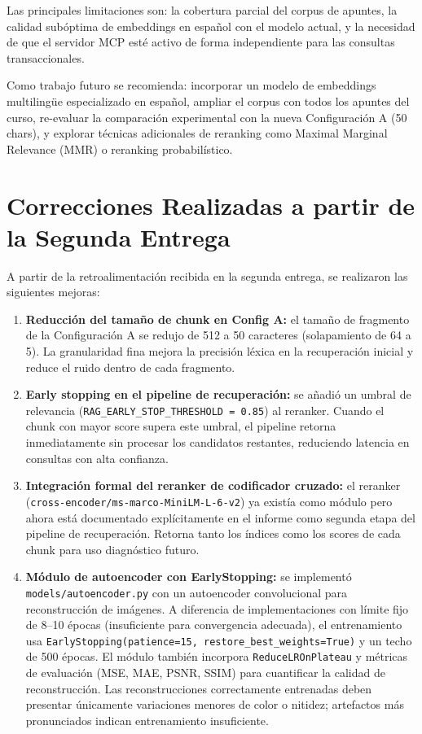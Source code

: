\documentclass[conference]{IEEEtran}
\begin{document}
Las principales limitaciones son: la cobertura parcial del corpus de apuntes, la calidad subóptima de embeddings en español con el modelo actual, y la necesidad de que el servidor MCP esté activo de forma independiente para las consultas transaccionales.

Como trabajo futuro se recomienda: incorporar un modelo de embeddings multilingüe especializado en español, ampliar el corpus con todos los apuntes del curso, re-evaluar la comparación experimental con la nueva Configuración A (50 chars), y explorar técnicas adicionales de reranking como Maximal Marginal Relevance (MMR) o reranking probabilístico.

\section{Correcciones Realizadas a partir de la Segunda Entrega}

A partir de la retroalimentación recibida en la segunda entrega, se realizaron las siguientes mejoras:

\begin{enumerate}
  \item \textbf{Reducción del tamaño de chunk en Config A:} el tamaño de fragmento de la Configuración A se redujo de 512 a 50 caracteres (solapamiento de 64 a 5). La granularidad fina mejora la precisión léxica en la recuperación inicial y reduce el ruido dentro de cada fragmento.

  \item \textbf{Early stopping en el pipeline de recuperación:} se añadió un umbral de relevancia (\texttt{RAG\_EARLY\_STOP\_THRESHOLD = 0.85}) al reranker. Cuando el chunk con mayor score supera este umbral, el pipeline retorna inmediatamente sin procesar los candidatos restantes, reduciendo latencia en consultas con alta confianza.

  \item \textbf{Integración formal del reranker de codificador cruzado:} el reranker (\texttt{cross-encoder/ms-marco-MiniLM-L-6-v2}) ya existía como módulo pero ahora está documentado explícitamente en el informe como segunda etapa del pipeline de recuperación. Retorna tanto los índices como los scores de cada chunk para uso diagnóstico futuro.

  \item \textbf{Módulo de autoencoder con EarlyStopping:} se implementó \texttt{models/autoencoder.py} con un autoencoder convolucional para reconstrucción de imágenes. A diferencia de implementaciones con límite fijo de 8--10 épocas (insuficiente para convergencia adecuada), el entrenamiento usa \texttt{EarlyStopping(patience=15, restore\_best\_weights=True)} y un techo de 500 épocas. El módulo también incorpora \texttt{ReduceLROnPlateau} y métricas de evaluación (MSE, MAE, PSNR, SSIM) para cuantificar la calidad de reconstrucción. Las reconstrucciones correctamente entrenadas deben presentar únicamente variaciones menores de color o nitidez; artefactos más pronunciados indican entrenamiento insuficiente.
\end{enumerate}
\end{document}
